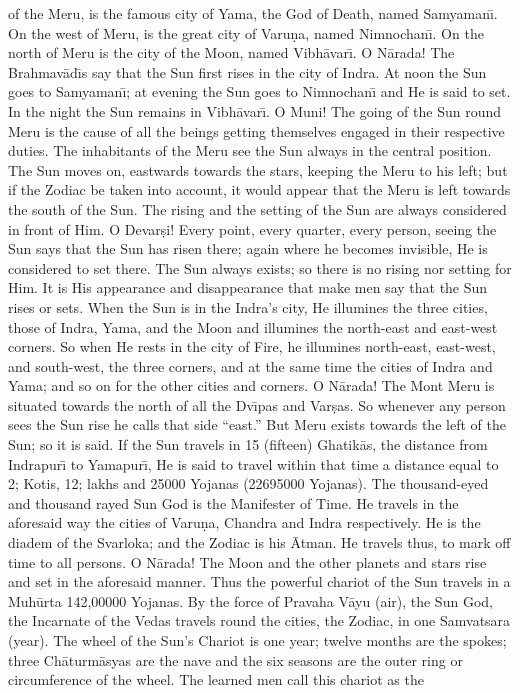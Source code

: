 of the Meru, is the famous city of Yama, the God of Death, named Samyaman\={\i}. On the west of Meru, is the great city of Varu\d{n}a, named Nimnochan\={\i}. On the north of Meru is the city of the Moon, named Vibh\=avar\={\i}. O N\=arada! The Brahmav\=ad\={\i}s say that the Sun first rises in the city of Indra. At noon the Sun goes to Samyaman\={\i}; at evening the Sun goes to Nimnochan\={\i} and He is said to set. In the night the Sun remains in Vibh\=avar\={\i}. O Muni! The going of the Sun round Meru is the cause of all the beings getting themselves engaged in their respective duties. The inhabitants of the Meru see the Sun always in the central position. The Sun moves on, eastwards towards the stars, keeping the Meru to his left; but if the Zodiac be taken into account, it would appear that the Meru is left towards the south of the Sun. The rising and the setting of the Sun are always considered in front of Him. O Devar\d{s}i! Every point, every quarter, every person, seeing the Sun says that the Sun has risen there; again where he becomes invisible, He is considered to set there. The Sun always exists; so there is no rising nor setting for Him. It is His appearance and disappearance that make men say that the Sun rises or sets. When the Sun is in the Indra's city, He illumines the three cities, those of Indra, Yama, and the Moon and illumines the north-east and east-west corners. So when He rests in the city of Fire, he illumines north-east, east-west, and south-west, the three corners, and at the same time the cities of Indra and Yama; and so on for the other cities and corners. O N\=arada! The Mont Meru is situated towards the north of all the Dv\={\i}pas and Var\d{s}as. So whenever any person sees the Sun rise he calls that side ``east.'' But Meru exists towards the left of the Sun; so it is said. If the Sun travels in 15 (fifteen) Ghatik\=as, the distance from Indrapur\={\i} to Yamapur\={\i}, He is said to travel within that time a distance equal to 2; Kotis, 12; lakhs and 25000 Yojanas (22695000 Yojanas). The thousand-eyed and thousand rayed Sun God is the Manifester of Time. He travels in the aforesaid way the cities of Varu\d{n}a, Chandra and Indra respectively. He is the diadem of the Svarloka; and the Zodiac is his \=Atman. He travels thus, to mark off time to all persons. O N\=arada! The Moon and the other planets and stars rise and set in the aforesaid manner. Thus the powerful chariot of the Sun travels in a Muh\=urta 142,00000 Yojanas. By the force of Pravaha V\=ayu (air), the Sun God, the Incarnate of the Vedas travels round the cities, the Zodiac, in one Samvatsara (year). The wheel of the Sun's Chariot is one year; twelve months are the spokes; three Ch\=aturm\=asyas are the nave and the six seasons are the outer ring or circumference of the wheel. The learned men call this chariot as the


